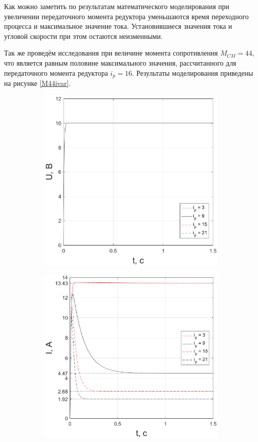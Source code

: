\documentclass[fleqn, a4paper, 11pt, russian]{article}
\begin{document}
	Как можно заметить по результатам математического моделирования при увеличении передаточного момента редуктора уменьшаются время переходного процесса и максимальное значение тока. Установившиеся значения тока и угловой скорости при этом остаются неизменными.
	
	Так же проведём исследования при величине момента сопротивления $M_{CM} = 44,$ что является равным половине максимального значения, рассчитанного для передаточного момента редуктора $i_p = 16$. Результаты моделирования приведены на рисунке \ref{M44ivar}.
	\begin{figure}[ht!]
		\centering
		\begin{subfigure}[b]{0.48\textwidth}
			\includegraphics[width = \textwidth]{ivar/eps/ivarM44U}
		\end{subfigure}
		\hfill
		\begin{subfigure}[b]{0.48\textwidth}
			\includegraphics[width = \textwidth]{ivar/eps/ivarM44I}

\end{subfigure}
\end{figure}
\end{document}

